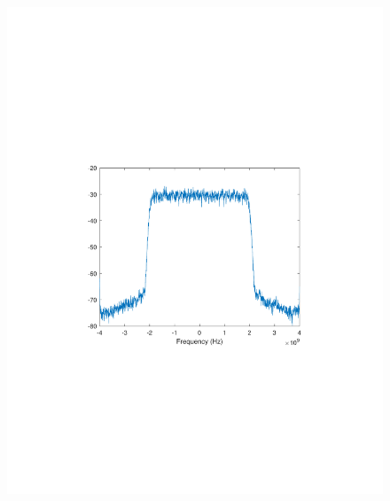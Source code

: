 \begin{refsection}
\begin{figure}[H]
	\centering
	\begin{minipage}{0.30\textwidth}
		\centering
		\includegraphics[clip, trim=4cm 8cm 4cm 8cm, width=1\textwidth]{./sdf/m_qam_system/figures/expResults/homodyne/6_4GBdInSig13dBc_AfMIMO2.pdf}
		\label{fig:4GBdEyeMIMO2}
	\end{minipage}
	\begin{minipage}{0.30\textwidth}
		\centering

\end{minipage}
\end{figure}
\end{refsection}
